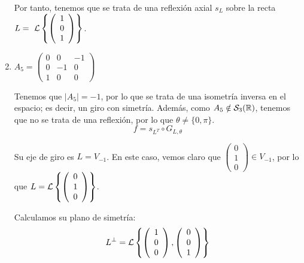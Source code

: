 \begin{ejercicio}
\begin{enumerate}
        Por tanto, tenemos que se trata de una reflexión axial $s_{L}$ sobre la recta $L=~\mathcal{L}\left\{\left(\begin{array}{c}
                     1 \\ 0 \\ 1
                \end{array}\right)\right\}$.




        \item $A_5=\left(\begin{array}{ccc}
            0 & 0 & -1 \\
            0 & -1 & 0 \\
            1 & 0 & 0
        \end{array}\right)$
        
        Tenemos que $|A_5|=-1$, por lo que se trata de una isometría inversa en el espacio; es decir, un giro con simetría. Además, como $A_5\notin \mathcal{S}_3(\mathbb{R})$, tenemos que no se trata de una reflexión, por lo que $\theta\neq \{0,\pi\}$.
        \begin{equation*}
            f=s_{L^T} \circ G_{L,\theta}
        \end{equation*}

        Su eje de giro es $L=V_{-1}$. En este caso, vemos claro que $\left(\begin{array}{c}
                     0 \\ 1 \\ 0
                \end{array}\right)\in V_{-1}$, por lo que $L=\mathcal{L}\left\{\left(\begin{array}{c}
                     0 \\ 1 \\ 0
                \end{array}\right)\right\}$.

        Calculamos su plano de simetría:
        \begin{equation*}
            L^\perp = \mathcal{L}\left\{\left(\begin{array}{c}
                     1 \\ 0 \\ 0
                \end{array}\right),
                \left(\begin{array}{c}
                     0 \\ 0 \\ 1
                \end{array}\right)\right\}
        \end{equation*}


\end{enumerate}
\end{ejercicio}
